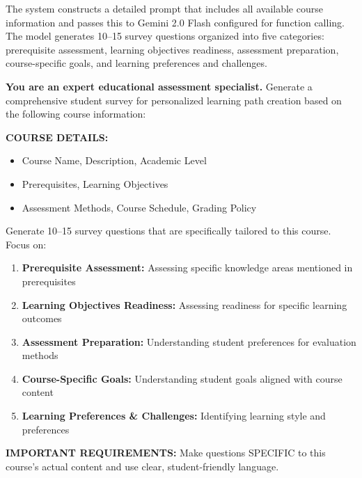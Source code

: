 \documentclass{stylefiles/capstone}
\begin{document}
The system constructs a detailed prompt that includes all available course information and passes this to Gemini 2.0 Flash configured for function calling. The model generates 10--15 survey questions organized into five categories: prerequisite assessment, learning objectives readiness, assessment preparation, course-specific goals, and learning preferences and challenges.

\begin{tcolorbox}[breakable, colframe=customcolor, colback=customcolor!30!white, coltitle=black, title=Survey Generation Prompt, fontupper=\small, label={box:user_query_prompt}]
\textbf{You are an expert educational assessment specialist.} Generate a comprehensive student survey for personalized learning path creation based on the following course information:

\vspace{0.5em}
\textbf{COURSE DETAILS:}
\begin{itemize}
    \item Course Name, Description, Academic Level
    \item Prerequisites, Learning Objectives
    \item Assessment Methods, Course Schedule, Grading Policy
\end{itemize}

\vspace{0.5em}
Generate 10--15 survey questions that are specifically tailored to this course. Focus on:

\begin{enumerate}
    \item \textbf{Prerequisite Assessment:} Assessing specific knowledge areas mentioned in prerequisites
    \item \textbf{Learning Objectives Readiness:} Assessing readiness for specific learning outcomes
    \item \textbf{Assessment Preparation:} Understanding student preferences for evaluation methods
    \item \textbf{Course-Specific Goals:} Understanding student goals aligned with course content
    \item \textbf{Learning Preferences \& Challenges:} Identifying learning style and preferences
\end{enumerate}

\vspace{0.5em}
\textbf{IMPORTANT REQUIREMENTS:} Make questions SPECIFIC to this course's actual content and use clear, student-friendly language.
\end{tcolorbox}
\end{document}
